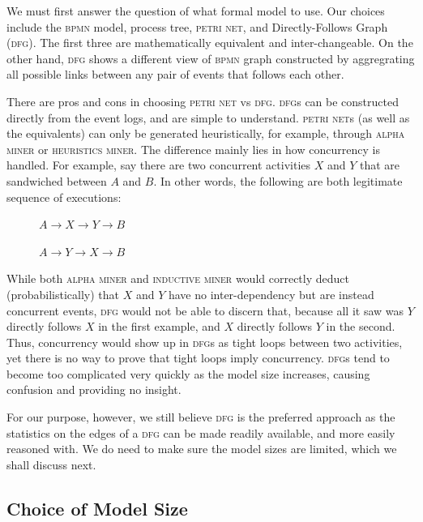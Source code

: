 \documentclass[conference]{IEEEtran}
\begin{document}
We must first answer the
question of what formal model to use. Our choices include 
the \textsc{bpmn} model,
process tree, \textsc{petri net}, and Directly-Follows Graph (\textsc{dfg}). The
first three are mathematically equivalent and inter-changeable. On the other
hand, \textsc{dfg} shows a different view of \textsc{bpmn} graph constructed by aggregrating all possible links
between any pair of events that follows each other.

There are pros and cons in choosing \textsc{petri net} vs \textsc{dfg}. \textsc{dfg}s can be constructed
directly from the event logs, and are simple to understand. \textsc{petri net}s (as well
as the equivalents) can only be generated heuristically, for example, 
through \textsc{alpha miner} or \textsc{heuristics miner}.
The difference mainly lies in how concurrency is handled. For example,
say there are two concurrent
activities $X$ and $Y$ that are sandwiched between
$A$ and $B$. In other words, the following are both legitimate sequence
of executions:

\vspace{0.5em}
$\phantom{xxxxx}A \rightarrow X \rightarrow Y \rightarrow B$

$\phantom{xxxxx}A \rightarrow Y \rightarrow X \rightarrow B$
\vspace{0.5em}


While both \textsc{alpha miner} and \textsc{inductive miner} would correctly deduct
(probabilistically) that $X$ and $Y$ have no inter-dependency but are
instead concurrent events, \textsc{dfg} would not be able to discern that, because
all it saw was $Y$ directly follows $X$ in the first example, and
$X$ directly follows $Y$ in the second. Thus, concurrency would
show up in \textsc{dfg}s as tight loops between two activities, yet there is no
way to prove that tight loops imply concurrency. \textsc{dfg}s tend
to become too complicated very quickly as the model size increases,
causing confusion and providing no insight.

For our purpose, however, we still believe  \textsc{dfg}
is the preferred approach as the statistics on the edges of a \textsc{dfg} can be
made readily available, and more easily reasoned with. We do need to make
sure the model sizes are limited, which
we shall
discuss next.

\subsection{Choice of Model Size}
\end{document}
